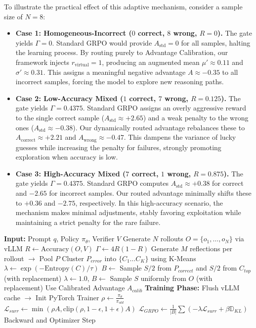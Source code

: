 To illustrate the practical effect of this adaptive mechanism, consider a sample size of $N=8$:
\begin{itemize}
    \item \textbf{Case 1: Homogeneous-Incorrect ($0$ correct, $8$ wrong, $R=0$).} The gate yields $\Gamma=0$. Standard GRPO would provide $A_{\text{std}}=0$ for all samples, halting the learning process. By routing purely to Advantage Calibration, our framework injects $r_{\text{virtual}}=1$, producing an augmented mean $\mu' \approx 0.11$ and $\sigma' \approx 0.31$. This assigns a meaningful negative advantage $A \approx -0.35$ to all incorrect samples, forcing the model to explore new reasoning paths.
    \item \textbf{Case 2: Low-Accuracy Mixed ($1$ correct, $7$ wrong, $R=0.125$).} The gate yields $\Gamma=0.4375$. Standard GRPO assigns an overly aggressive reward to the single correct sample ($A_{\text{std}} \approx +2.65$) and a weak penalty to the wrong ones ($A_{\text{std}} \approx -0.38$). Our dynamically routed advantage rebalances these to $A_{\text{correct}} \approx +2.21$ and $A_{\text{wrong}} \approx -0.47$. This dampens the variance of lucky guesses while increasing the penalty for failures, strongly promoting exploration when accuracy is low.
    \item \textbf{Case 3: High-Accuracy Mixed ($7$ correct, $1$ wrong, $R=0.875$).} The gate yields $\Gamma=0.4375$. Standard GRPO computes $A_{\text{std}} \approx +0.38$ for correct and $-2.65$ for incorrect samples. Our routed advantage minimally shifts these to $+0.36$ and $-2.75$, respectively. In this high-accuracy scenario, the mechanism makes minimal adjustments, stably favoring exploitation while maintaining a strict penalty for the rare failure.
\end{itemize}

\begin{algorithm}
\caption{SB-GRPO Training Step}
\label{alg:training_step}
\begin{algorithmic}[1]
\STATE \textbf{Input:} Prompt $q$, Policy $\pi_\theta$, Verifier $V$
\STATE Generate $N$ rollouts $O = \{o_1, \dots, o_N\}$ via vLLM
\STATE $R \gets \text{Accuracy}(O, V)$
\STATE $\Gamma \gets 4R(1-R)$
    \STATE Generate $M$ reflections per rollout $\to$ Pool $P$
    \STATE Cluster $P_{error}$ into $\{C_1 \dots C_K\}$ using K-Means
    \STATE $\lambda \gets \exp(-\text{Entropy}(C)/\tau)$
    \STATE $B \gets$ Sample $S/2$ from $P_{correct}$ and $S/2$ from $C_{top}$ (with replacement)
\ELSE
    \STATE $\lambda \gets 1.0$, $B \gets$ Sample $S$ uniformly from $O$ (with replacement)
    \STATE Use Calibrated Advantage $A_{calib}$
\ENDIF
\STATE \textbf{Training Phase:}
\STATE Flush vLLM cache $\to$ Init PyTorch Trainer
\STATE $\rho \gets \frac{\pi_\theta}{\pi_{old}}$
\STATE $\mathcal{L}_{surr} \gets \min\left(\rho A, \text{clip}\left(\rho, 1-\epsilon, 1+\epsilon\right)A\right)$
\STATE $\mathcal{L}_{GRPO} \gets \frac{1}{|B|} \sum \left( -\lambda \mathcal{L}_{surr} + \beta \mathbb{D}_{KL} \right)$
\STATE Backward and Optimizer Step
\end{algorithmic}
\end{algorithm}

